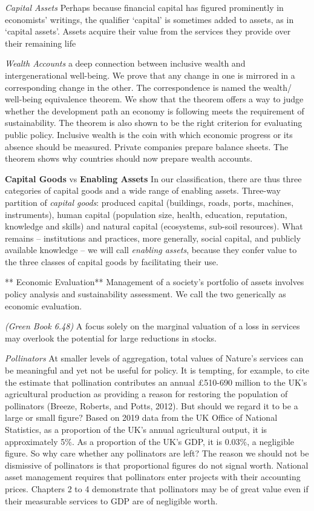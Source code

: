 \documentclass[
]{book}
\begin{document}
\emph{Capital Assets}
Perhaps because financial capital has figured prominently in
economists' writings, the qualifier `capital' is sometimes added to assets, as in `capital assets'.
Assets acquire their value from the services they provide over their remaining life

\emph{Wealth Accounts}
a deep connection
between inclusive wealth and intergenerational well-being. We prove that any change in one
is mirrored in a corresponding change in the other. The correspondence is named the wealth/
well-being equivalence theorem. We show that the theorem offers a way to judge whether the
development path an economy is following meets the requirement of sustainability. The theorem
is also shown to be the right criterion for evaluating public policy. Inclusive wealth is the coin
with which economic progress or its absence should be measured. Private companies prepare
balance sheets. The theorem shows why countries should now prepare wealth accounts.

\textbf{Capital Goods} vs \textbf{Enabling Assets}
In our classification, there are thus three categories of capital goods and
a wide range of enabling assets.
Three-way partition of \emph{capital goods}: produced capital (buildings, roads,
ports, machines, instruments), human capital (population size, health, education, reputation,
knowledge and skills) and natural capital (ecosystems, sub-soil resources).
What remains -- institutions and practices, more generally, social capital, and
publicly available knowledge --
we will call \emph{enabling assets},
because they confer value to the three classes of capital goods by facilitating their use.

** Economic Evaluation**
Management of a society's portfolio of assets involves
policy analysis and
sustainability assessment.
We call the two generically as economic evaluation.

\emph{(Green Book 6.48)}
A focus solely on the marginal valuation of a loss in services may overlook the potential
for large reductions in stocks.

\emph{Pollinators}
At smaller levels of aggregation, total values of Nature's services can be meaningful and yet not
be useful for policy. It is tempting, for example, to cite the estimate that pollination contributes
an annual £510-690 million to the UK's agricultural production as providing a reason for
restoring the population of pollinators (Breeze, Roberts, and Potts, 2012). But should we regard
it to be a large or small figure? Based on 2019 data from the UK Office of National Statistics,
as a proportion of the UK's annual agricultural output, it is approximately 5\%. As a proportion
of the UK's GDP, it is 0.03\%, a negligible figure. So why care whether any pollinators are left?
The reason we should not be dismissive of pollinators is that proportional figures do not signal
worth. National asset management requires that pollinators enter projects with their accounting
prices. Chapters 2 to 4 demonstrate that pollinators may be of great value even if their
measurable services to GDP are of negligible worth.
\end{document}
